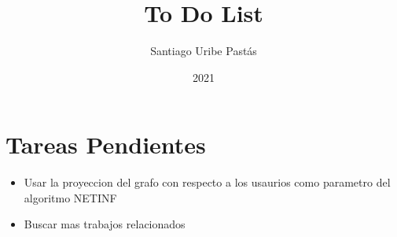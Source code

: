 \documentclass{article}
\title{To Do List}
\author{Santiago Uribe Pastás}
\date{2021}
\begin{document}
\maketitle

\section{Tareas Pendientes}
\begin{itemize}
    \item Usar la proyeccion del grafo con respecto a los usaurios como parametro del algoritmo NETINF
    \item Buscar mas trabajos relacionados
\end{itemize}
\end{document}
